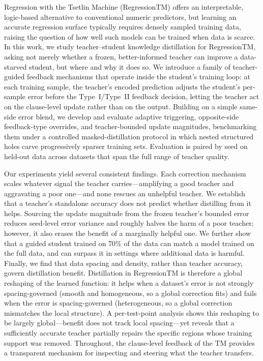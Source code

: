 Regression with the Tsetlin Machine (RegressionTM) offers an interpretable,
logic-based alternative to conventional numeric predictors, but learning an accurate
regression surface typically requires densely sampled training data, raising the
question of how well such models can be trained when data is scarce. In this work, we
study teacher--student knowledge distillation for RegressionTM, asking not merely
whether a frozen, better-informed teacher can improve a data-starved student, but where
and why it does so. We introduce a family of teacher-guided feedback mechanisms that
operate inside the student's training loop: at each training sample, the teacher's
encoded prediction adjusts the student's per-sample error before the Type~I/Type~II
feedback decision, letting the teacher act on the clause-level update rather than on the
output. Building on a simple same-side error blend, we develop and evaluate adaptive
triggering, opposite-side feedback-type overrides, and teacher-bounded update
magnitudes, benchmarking them under a controlled masked-distillation protocol in which
nested structured holes carve progressively sparser training sets. Evaluation is paired
by seed on held-out data across datasets that span the full range of teacher quality.

Our experiments yield several consistent findings. Each correction mechanism scales
whatever signal the teacher carries---amplifying a good teacher and aggravating a poor
one---and none rescues an unhelpful teacher. We establish that a teacher's standalone
accuracy does not predict whether distilling from it helps. Sourcing the update
magnitude from the frozen teacher's bounded error reduces seed-level error variance and
roughly halves the harm of a poor teacher; however, it also erases the benefit of a
marginally helpful one. We further show that a guided student trained on 70\% of the
data can match a model trained on the full data, and can surpass it in settings where
additional data is harmful. Finally, we find that data spacing and density, rather than
teacher accuracy, govern distillation benefit. Distillation in RegressionTM is therefore
a global reshaping of the learned function: it helps when a dataset's error is not
strongly spacing-governed (smooth and homogeneous, so a global correction fits) and
fails when the error is spacing-governed (heterogeneous, so a global correction
mismatches the local structure). A per-test-point analysis shows this reshaping to be
largely global---benefit does not track local spacing---yet reveals that a sufficiently
accurate teacher partially repairs the specific regions whose training support was
removed. Throughout, the clause-level feedback of the TM provides a transparent
mechanism for inspecting and steering what the teacher transfers.
